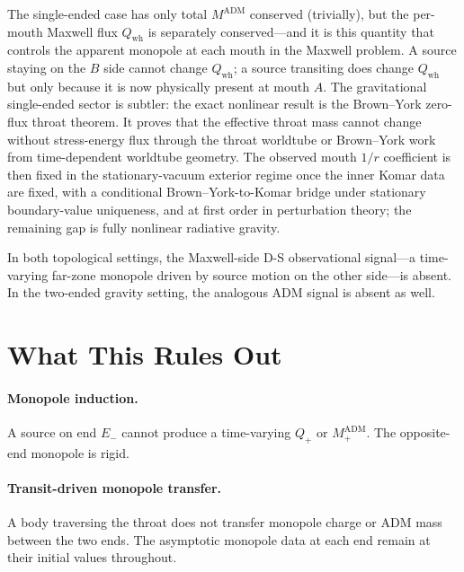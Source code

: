 \documentclass[aps,prd,onecolumn,nofootinbib,superscriptaddress]{revtex4-2}
\begin{document}
The single-ended case has only total $M^{\mathrm{ADM}}$ conserved (trivially),
but the per-mouth Maxwell flux $Q_{\mathrm{wh}}$ is separately conserved---and
it is this quantity that controls the apparent monopole at each mouth in the
Maxwell problem.  A source staying on the $B$ side cannot change
$Q_{\mathrm{wh}}$; a source transiting does change $Q_{\mathrm{wh}}$ but only
because it is now physically present at mouth $A$.  The gravitational
single-ended sector is subtler: the exact nonlinear result is the
Brown--York zero-flux throat theorem.  It proves that the effective throat mass
cannot change without stress-energy flux through the throat worldtube or
Brown--York work from time-dependent worldtube geometry.  The observed mouth
$1/r$ coefficient is then fixed in the stationary-vacuum exterior regime once
the inner Komar data are fixed, with a conditional Brown--York-to-Komar bridge
under stationary boundary-value uniqueness, and at first order in perturbation
theory; the remaining gap is fully nonlinear radiative gravity.

In both topological settings, the Maxwell-side D-S observational signal---a
time-varying far-zone monopole driven by source motion on the other side---is
absent.  In the two-ended gravity setting, the analogous ADM signal is absent
as well.

\section{What This Rules Out}
\label{sec:ruled-out}

\paragraph{Monopole induction.}
A source on end $E_-$ cannot produce a time-varying $Q_+$ or $M_+^{\mathrm{ADM}}$.
The opposite-end monopole is rigid.

\paragraph{Transit-driven monopole transfer.}
A body traversing the throat does not transfer monopole charge or ADM mass
between the two ends.  The asymptotic monopole data at each end remain at their
initial values throughout.
\end{document}
